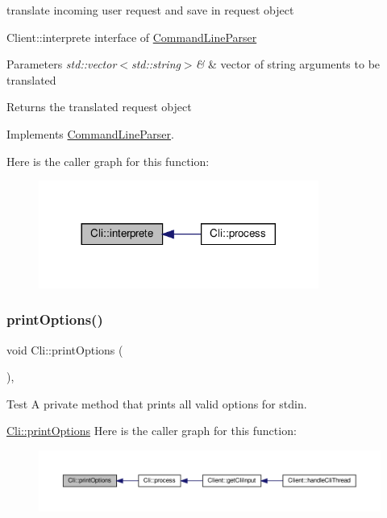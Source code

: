 translate incoming user request and save in request object 

Client\+::interprete interface of \hyperlink{classCommandLineParser}{Command\+Line\+Parser} 
\begin{DoxyParams}{Parameters}
{\em std\+::vector$<$std\+::string$>$\&} & vector of string arguments to be translated \\
\hline
\end{DoxyParams}
\begin{DoxyReturn}{Returns}
the translated request object 
\end{DoxyReturn}


Implements \hyperlink{classCommandLineParser}{Command\+Line\+Parser}.

Here is the caller graph for this function\+:\nopagebreak
\begin{figure}[H]
\begin{center}
\leavevmode
\includegraphics[width=260pt]{classCli_af29a5d8a0c3863f69c0e21133dee2d1b_icgraph}
\end{center}
\end{figure}
\mbox{\label{classCli_a8251d6c89698aaf128318fc3ad4b2906}} 
\subsubsection{\texorpdfstring{print\+Options()}{printOptions()}}
{\footnotesize\ttfamily void Cli\+::print\+Options (\begin{DoxyParamCaption}{ }\end{DoxyParamCaption})\hspace{0.3cm}{\ttfamily [inline]}, {\ttfamily [private]}}



Test A private method that prints all valid options for stdin. 

\hyperlink{classCli_a8251d6c89698aaf128318fc3ad4b2906}{Cli\+::print\+Options} Here is the caller graph for this function\+:\nopagebreak
\begin{figure}[H]
\begin{center}
\leavevmode
\includegraphics[width=350pt]{classCli_a8251d6c89698aaf128318fc3ad4b2906_icgraph}
\end{center}
\end{figure}
\mbox{\label{classCli_aa2b3675ef3e3bb01ed0d1997460a0e28}} 
